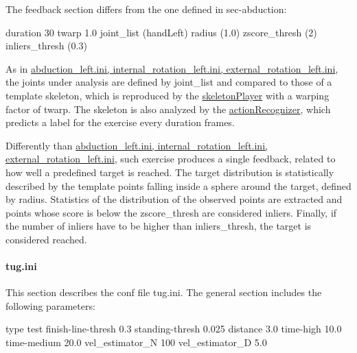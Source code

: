 The feedback section differs from the one defined in sec-\/abduction\+:


\begin{DoxyCode}
[feedback]
duration                       30
twarp                          1.0
joint\_list                     (handLeft)
radius                         (1.0)
zscore\_thresh                  (2)
inliers\_thresh                 (0.3)
\end{DoxyCode}


As in \hyperlink{group__motionAnalyzer_sec-abduction}{abduction\+\_\+left.\+ini, internal\+\_\+rotation\+\_\+left.\+ini, external\+\_\+rotation\+\_\+left.\+ini}, the joints under analysis are defined by {\ttfamily joint\+\_\+list} and compared to those of a template skeleton, which is reproduced by the \hyperlink{group__skeletonPlayer}{skeleton\+Player} with a warping factor of {\ttfamily twarp}. The skeleton is also analyzed by the \hyperlink{group__actionRecognizer}{action\+Recognizer}, which predicts a label for the exercise every {\ttfamily duration} frames.

Differently than \hyperlink{group__motionAnalyzer_sec-abduction}{abduction\+\_\+left.\+ini, internal\+\_\+rotation\+\_\+left.\+ini, external\+\_\+rotation\+\_\+left.\+ini}, such exercise produces a single feedback, related to how well a predefined target is reached. The target distribution is statistically described by the template points falling inside a sphere around the {\ttfamily target}, defined by {\ttfamily radius}. Statistics of the distribution of the observed points are extracted and points whose score is below the {\ttfamily zscore\+\_\+thresh} are considered inliers. Finally, if the number of inliers have to be higher than {\ttfamily inliers\+\_\+thresh}, the target is considered reached.\hypertarget{group__motionAnalyzer_sec-tug}{}\paragraph{tug.\+ini}\label{group__motionAnalyzer_sec-tug}
This section describes the conf file tug.\+ini. The {\ttfamily general} section includes the following parameters\+:


\begin{DoxyCode}
[general]
type                           test
finish-line-thresh             0.3
standing-thresh                0.025
distance                       3.0
time-high                      10.0
time-medium                    20.0
vel\_estimator\_N                100
vel\_estimator\_D                5.0
\end{DoxyCode}


